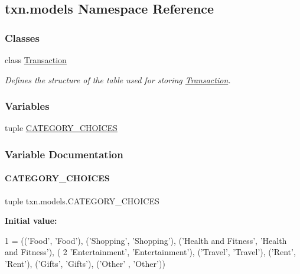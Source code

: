 \hypertarget{namespacetxn_1_1models}{}\subsection{txn.\+models Namespace Reference}
\label{namespacetxn_1_1models}
\subsubsection*{Classes}
\begin{DoxyCompactItemize}
\item 
class \hyperlink{classtxn_1_1models_1_1Transaction}{Transaction}
\begin{DoxyCompactList}\small\item\em Defines the structure of the table used for storing \hyperlink{classtxn_1_1models_1_1Transaction}{Transaction}. \end{DoxyCompactList}\end{DoxyCompactItemize}
\subsubsection*{Variables}
\begin{DoxyCompactItemize}
\item 
tuple \hyperlink{namespacetxn_1_1models_a034516542ac27ed16242da9c4bc5b636}{C\+A\+T\+E\+G\+O\+R\+Y\+\_\+\+C\+H\+O\+I\+C\+ES}
\end{DoxyCompactItemize}


\subsubsection{Variable Documentation}
\mbox{\label{namespacetxn_1_1models_a034516542ac27ed16242da9c4bc5b636}} 
\paragraph{\texorpdfstring{C\+A\+T\+E\+G\+O\+R\+Y\+\_\+\+C\+H\+O\+I\+C\+ES}{CATEGORY\_CHOICES}}
{\footnotesize\ttfamily tuple txn.\+models.\+C\+A\+T\+E\+G\+O\+R\+Y\+\_\+\+C\+H\+O\+I\+C\+ES}

{\bfseries Initial value\+:}
\begin{DoxyCode}
1 =  ((\textcolor{stringliteral}{'Food'}, \textcolor{stringliteral}{'Food'}), (\textcolor{stringliteral}{'Shopping'}, \textcolor{stringliteral}{'Shopping'}), (\textcolor{stringliteral}{'Health and Fitness'}, \textcolor{stringliteral}{'Health and Fitness'}), (
2     \textcolor{stringliteral}{'Entertainment'}, \textcolor{stringliteral}{'Entertainment'}), (\textcolor{stringliteral}{'Travel'}, \textcolor{stringliteral}{'Travel'}), (\textcolor{stringliteral}{'Rent'}, \textcolor{stringliteral}{'Rent'}), (\textcolor{stringliteral}{'Gifts'}, \textcolor{stringliteral}{'Gifts'}), (\textcolor{stringliteral}{'Other'}
      , \textcolor{stringliteral}{'Other'}))
\end{DoxyCode}
